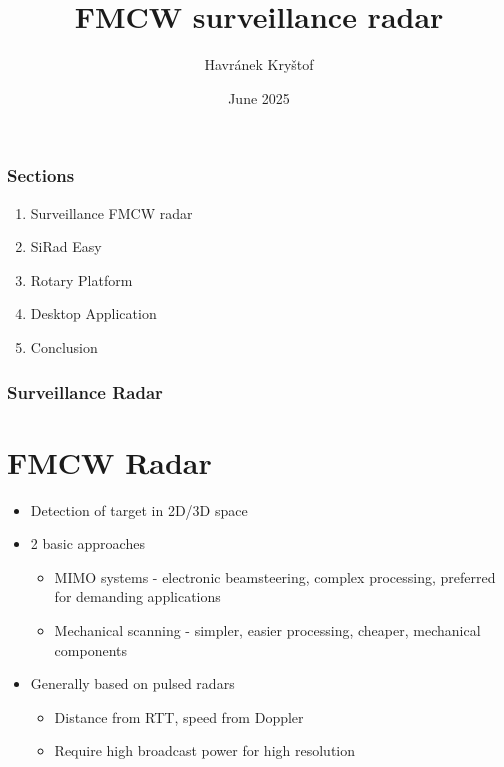 \documentclass[aspectratio=43]{beamer}
\title{FMCW surveillance radar}
\author{Havránek Kryštof}
\date{June 2025}
\institute{České vysoké učení technické v Praze}
\begin{document}
\begin{frame}[plain]
  \maketitle
\end{frame}

\clearpage
\setcounter{framenumber}{0}

\begin{frame}[fragile]
  \frametitle{Sections}

  \begin{enumerate}
    \item Surveillance FMCW radar
    \item SiRad Easy
    \item Rotary Platform
    \item Desktop Application
    \item Conclusion
  \end{enumerate}
\end{frame}


\begin{frame}[fragile]
  \frametitle{Surveillance Radar}
  \section{FMCW Radar}

  \begin{itemize}
    \item Detection of target in 2D/3D space
    \item 2 basic approaches
      \begin{itemize}
        \item MIMO systems - electronic beamsteering, complex processing, preferred for demanding applications
        \item Mechanical scanning - simpler, easier processing, cheaper, mechanical components
      \end{itemize}
    \item Generally based on pulsed radars
			\begin{itemize}
				\item Distance from RTT, speed from Doppler
				\item Require high broadcast power for high resolution
			\end{itemize}
  \end{itemize}
\end{frame}
\end{document}
